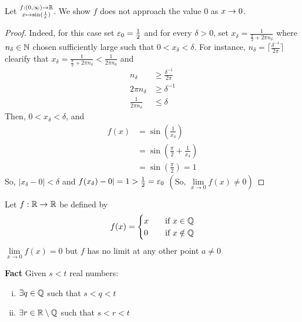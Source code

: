\begin{example*}
    Let $\substack{f:(0, \infty)\rightarrow \mathbb R \\
    x\mapsto \sin(\frac{1}{x})}$.
    We show $f$ does not approach the value $0$ as $x \rightarrow 0$.
\end{example*}
\begin{proof}
    Indeed, for this case set $\varepsilon_0 = \frac{1}{2}$ 
    and for every $\delta > 0$, set $x_\delta=\frac{1}{\frac{\pi}{2} + 2\pi n_\delta}$
    where $n_\delta \in \mathbb N$ chosen sufficiently large such that $0 < x_\delta < \delta$.
    For instance, $n_\delta = \lceil\frac{\delta^{-1}}{2\pi}\rceil$
    clearify that $x_\delta=\frac{1}{\frac{\pi}{2} + 2\pi n_\delta} < \frac{1}{2\pi n_\delta}$ and 
    \begin{align*}
        n_\delta &\geq \frac{\delta^{-1}}{2\pi} \\
        2\pi n_\delta &\geq \delta^{-1} \\
        \frac{1}{2\pi n_\delta} &\leq \delta
    \end{align*}
    Then, $0 < x_\delta < \delta$, and 
    \begin{align*}
        f(x) &= \sin\left(\frac{1}{x_\delta}\right) \\
        &= \sin\left(\frac{\pi}{2} + \frac{1}{x_\delta}\right)\\
        &= \sin\left(\frac{\pi}{2}\right) = 1
    \end{align*}
    So, $|x_\delta - 0| < \delta$ and $f(x_\delta) - 0| = 1 > \frac{1}{2} = \varepsilon_0$ $\left(\text{So, }\lim\limits_{x \to 0} f(x) \neq 0\right)$
\end{proof}

\begin{example}
    Let $f: \mathbb R \rightarrow \mathbb R$ be defined by
    \[ f(x) =
  \begin{cases}
    x       & \quad \text{if } x\in\mathbb Q\\
    0  & \quad \text{if } x\notin\mathbb Q
  \end{cases}
\]
$\lim\limits_{x \to 0} f(x) = 0$ but $f$ has no limit at any other point $a \neq 0$
\end{example}

\textbf{Fact} Given $s < t$ real numbers:
\begin{enumerate}[(i)]
    \item $\exists q \in \mathbb Q$ such that $s < q < t$
    \item $\exists r \in \mathbb R\setminus\mathbb Q$ such that $s < r < t$
\end{enumerate}

